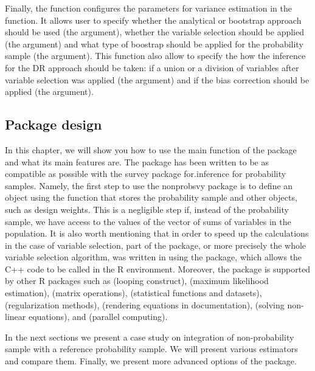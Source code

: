\documentclass[
]{jss}
\begin{document}
Finally, the  function configures the parameters for
variance estimation in the  function. It allows user to
specify whether the analytical or bootstrap approach should be used (the
 argument), whether the variable selection should be
applied (the  argument) and what type of boostrap
should be applied for the probability sample (the 
argument). This function also allow to specify the how the inference for
the DR approach should be taken: if a union or a division of variables
after variable selection was applied (the  argument) and
if the bias correction should be applied (the 
argument).

\subsection{Package design}\label{package-design}

In this chapter, we will show you how to use the main 
function of the package and what its main features are. The package has
been written to be as compatible as possible with the survey package
for.inference for probability samples. Namely, the first step to use the
nonprobsvy package is to define an object using the 
function that stores the probability sample  and other
objects, such as design weights. This is a negligible step if, instead
of the probability sample, we have access to the values of the vector of
sums of variables in the population. It is also worth mentioning that in
order to speed up the calculations in the case of variable selection,
part of the package, or more precisely the whole variable selection
algorithm, was written in  using the 
\citep{Rcpp} package, which allows the C++ code to be called in the R
environment. Moreover, the package is supported by other R packages such
as  \citep{foreach} (looping construct), 
\citep{maxLik} (maximum likelihood estimation), 
\citep{Matrix} (matrix operations),  \citet{MASS} (statistical
functions and datasets),  \citep{ncvreg} (regularization
methods),  \citep{mathjaxr} (rendering equations in
documentation),  \cite{nleqslv} (solving non-linear
equations), and  \citep{doParallel} (parallel
computing).

In the next sections we present a case study on integration of
non-probability sample with a reference probability sample. We will
present various estimators and compare them. Finally, we present more
advanced options of the package.
\end{document}
